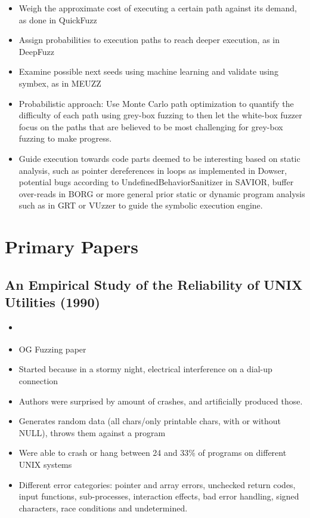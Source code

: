 \documentclass{article}
\begin{document}
\begin{itemize}
  \item Weigh the approximate cost of executing a certain path against its demand, as done in QuickFuzz\cite{QuickFuzz}
  \item Assign probabilities to execution paths to reach deeper execution, as in DeepFuzz\cite{DeepFuzz}
  \item Examine possible next seeds using machine learning and validate using symbex, as in MEUZZ\cite{MEUZZ}
  \item Probabilistic approach: Use Monte Carlo path optimization to quantify the difficulty of each path using grey-box fuzzing to then let the white-box fuzzer focus on the paths that are believed to be most challenging for grey-box fuzzing to make progress.\cite{DigFuzz}
  \item Guide execution towards code parts deemed to be interesting based on static analysis, such as pointer dereferences in loops as implemented in Dowser\cite{Dowser}, potential bugs according to UndefinedBehaviorSanitizer\cite{UndefinedBehaviorSanitizer} in SAVIOR\cite{SAVIOR}, buffer over-reads in BORG\cite{BORG} or more general prior static or dynamic program analysis such as in GRT\cite{GRT} or VUzzer\cite{VUzzer} to guide the symbolic execution engine.
\end{itemize}

\label{ConstraintSolving}

\pagebreak
\section{Primary Papers}
\subsection{An Empirical Study of the Reliability of UNIX Utilities (1990)}
\begin{itemize}
  \item \cite{UNIX}
  \item OG Fuzzing paper
  \item Started because in a stormy night, electrical interference on a dial-up connection
  \item Authors were surprised by amount of crashes, and artificially produced those.
  \item Generates random data (all chars/only printable chars, with or without NULL), throws them against a program
  \item Were able to crash or hang between 24 and 33\% of programs on different UNIX systems
  \item Different error categories: pointer and array errors, unchecked return codes, input functions, sub-processes, interaction effects, bad error handling, signed characters, race conditions and undetermined.
\end{itemize}
\end{document}
